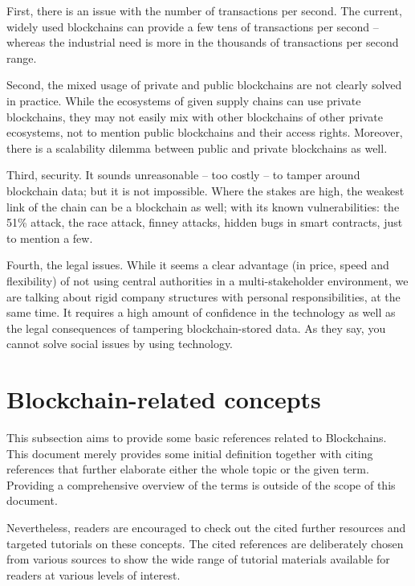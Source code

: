 \documentclass[a4paper]{article}
\begin{document}
First, there is an issue with the number of transactions per second. The current, widely used blockchains can provide a few tens of transactions per second -- whereas the industrial need is more in the thousands of transactions per second range. 

Second, the mixed usage of private and public blockchains are not clearly solved in practice. While the ecosystems of given supply chains can use private blockchains, they may not easily mix with other blockchains of other private ecosystems, not to mention public blockchains and their access rights. Moreover, there is a scalability dilemma between public and private blockchains as well.

Third, security. It sounds unreasonable -- too costly -- to tamper around blockchain data; but it is not impossible. Where the stakes are high, the weakest link of the chain can be a blockchain as well; with its known vulnerabilities: the 51\% attack, the race attack, finney attacks, hidden bugs in smart contracts, just to mention a few.

Fourth, the legal issues. While it seems a clear advantage (in price, speed and flexibility) of not using central authorities in a multi-stakeholder environment, we are talking about rigid company structures with personal responsibilities, at the same time. It requires a high amount of confidence in the technology as well as the legal consequences of tampering blockchain-stored data. As they say, you cannot solve social issues by using technology.



\section{Blockchain-related concepts}

This subsection aims to provide some basic references related to Blockchains. This document merely provides some initial definition together with citing references that further elaborate either the whole topic or the given term. Providing a comprehensive overview of the terms is outside of the scope of this document.

Nevertheless, readers are encouraged to check out the cited further resources and targeted tutorials on these concepts. The cited references are deliberately chosen from various sources to show the wide range of tutorial materials available for readers at various levels of interest. 
\end{document}

